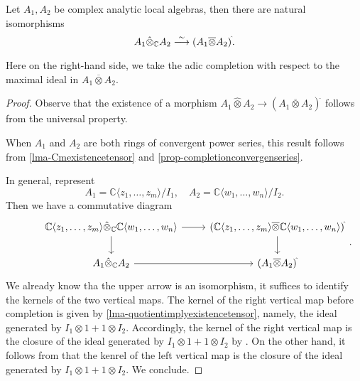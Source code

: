 \begin{thm}
    Let $A_1,A_2$ be complex analytic local algebras, then there are natural isomorphisms
    \[
      A_1\hat{\otimes}_{\mathbb{C}} A_2 \stackrel{\sim}{\longrightarrow}  (A_1\overline{\otimes} A_2)^{\hat{}}.
    \]
\end{thm}
Here on the right-hand side, we take the adic completion with respect to the maximal ideal in $A_1\overline{\otimes} A_2$.
\begin{proof}
    Observe that the existence of a morphism $A_1\hat{\otimes} A_2 \rightarrow  (A_1\overline{\otimes} A_2)^{\hat{}}$ follows from the universal property.

    When $A_1$ and $A_2$ are both rings of convergent power series, this result follows from \cref{lma-Cmexistencetensor} and \cref{prop-completionconvergenseries}. 

    In general, represent 
    \[
        A_1=\mathbb{C}\langle z_1,\ldots,z_m\rangle/I_1,\quad   A_2=\mathbb{C}\langle w_1,\ldots,w_n\rangle/I_2.
    \]
    Then we have a commutative diagram
    \[ 
    \begin{tikzcd}
        & \mathbb{C}\langle z_1,\ldots,z_m\rangle \hat{\otimes}_{\mathbb{C}}  \mathbb{C}\langle w_1,\ldots,w_n\rangle \arrow[r]\arrow[d] & (\mathbb{C}\langle z_1,\ldots,z_m\rangle\overline{\otimes} \mathbb{C}\langle w_1,\ldots,w_n\rangle)^{\hat{}} \arrow[d]\\
        & A_1\hat{\otimes}_{\mathbb{C}} A_2 \arrow[r] & (A_1\overline{\otimes} A_2)^{\hat{}}
    \end{tikzcd}.
    \]
    We already know tha the upper arrow is an isomorphism, it suffices to identify the kernels of the two vertical maps. The kernel of the right vertical map before completion is given by \cref{lma-quotientimplyexistencetensor}, namely, the ideal generated by $I_1\otimes 1+1\otimes I_2$. Accordingly, the kernel of the right vertical map is the closure of the ideal generated by $I_1\otimes 1+1\otimes I_2$ by \cite[\href{https://stacks.math.columbia.edu/tag/0ARZ}{Tag 0ARZ}]{stacks-project}. On the other hand, it follows from \cite[\href{https://stacks.math.columbia.edu/tag/0ARZ}{Tag 0ARZ}]{stacks-project} that the kenrel of the left vertical map is the closure of the ideal generated by $I_1\otimes 1+1\otimes I_2$. We conclude.
\end{proof}

